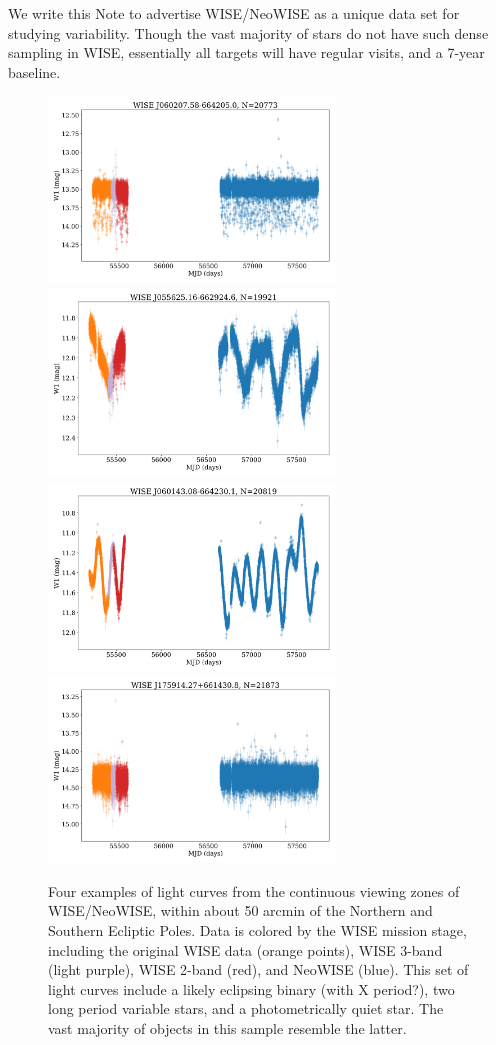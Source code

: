 \documentclass[modern]{rnaastex}
\begin{document}
We write this Note to advertise WISE/NeoWISE as a unique data set for studying variability. Though the vast majority of stars do not have such dense sampling in WISE, essentially all targets will have regular visits, and a 7-year baseline.


\begin{figure}[h!]
\begin{center}
\includegraphics[width=3in]{img1a.png}
\includegraphics[width=3in]{img1b.png}\\
\includegraphics[width=3in]{img1c.png}
\includegraphics[width=3in]{img1d.png}
\caption{Four examples of light curves from the continuous viewing zones of WISE/NeoWISE, within about 50 arcmin of the Northern and Southern Ecliptic Poles. Data is colored by the WISE mission stage, including the original WISE data (orange points), WISE 3-band (light purple), WISE 2-band (red), and NeoWISE (blue). This set of light curves include a likely eclipsing binary (with X period?), two long period variable stars, and a photometrically quiet star. The vast majority of objects in this sample resemble the latter.
\label{fig:1}}
\end{center}
\end{figure}
\end{document}
